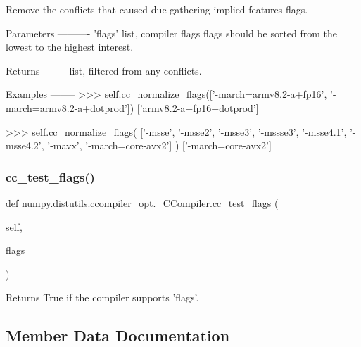 \begin{DoxyVerb}Remove the conflicts that caused due gathering implied features flags.

Parameters
----------
'flags' list, compiler flags
    flags should be sorted from the lowest to the highest interest.

Returns
-------
list, filtered from any conflicts.

Examples
--------
>>> self.cc_normalize_flags(['-march=armv8.2-a+fp16', '-march=armv8.2-a+dotprod'])
['armv8.2-a+fp16+dotprod']

>>> self.cc_normalize_flags(
    ['-msse', '-msse2', '-msse3', '-mssse3', '-msse4.1', '-msse4.2', '-mavx', '-march=core-avx2']
)
['-march=core-avx2']
\end{DoxyVerb}
 \mbox{\label{classnumpy_1_1distutils_1_1ccompiler__opt_1_1__CCompiler_a27031cb1b233cf3d05dc4935326b8a7e}} 
\subsubsection{\texorpdfstring{cc\+\_\+test\+\_\+flags()}{cc\_test\_flags()}}
{\footnotesize\ttfamily def numpy.\+distutils.\+ccompiler\+\_\+opt.\+\_\+\+C\+Compiler.\+cc\+\_\+test\+\_\+flags (\begin{DoxyParamCaption}\item[{}]{self,  }\item[{}]{flags }\end{DoxyParamCaption})}

\begin{DoxyVerb}Returns True if the compiler supports 'flags'.
\end{DoxyVerb}
 

\subsection{Member Data Documentation}
\mbox{\label{classnumpy_1_1distutils_1_1ccompiler__opt_1_1__CCompiler_aa3d3f3acfd7e7310cd0b4ac27e697fc0}} 

